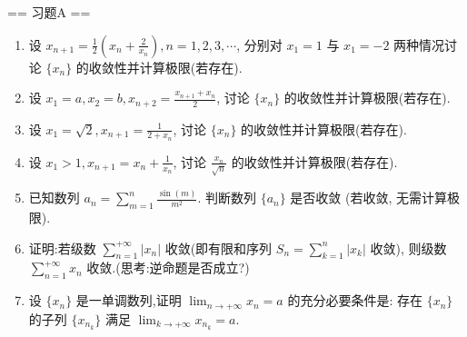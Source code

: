 \newenvironment{solution}{\begin{proofc}[解答]}{\end{proofc}}

== 习题A ==

\begin{enumerate}
    \item[1.]设 $\displaystyle x_{n + 1} = \frac{1}{2}\left(x_{n} + \frac{2}{x_{n}}\right), n = 1,2,3,\cdots$, 分别对 $x_{1} = 1$ 与 $x_{1} = -2$ 两种情况讨论 $\{x_{n}\}$ 的收敛性并计算极限(若存在).
    
    \item[2.]设 $\displaystyle x_{1} = a,x_{2} = b, x_{n + 2} = \frac{x_{n + 1} + x_{n}}{2}$, 讨论 $\{x_{n}\}$ 的收敛性并计算极限(若存在).
    
    \item[3.]设 $\displaystyle x_{1} = \sqrt{2}, x_{n + 1} = \frac{1}{2 + x_{n}}$, 讨论 $\{x_{n}\}$ 的收敛性并计算极限(若存在).

    \item[4.]设 $\displaystyle x_{1} > 1, x_{n + 1} = x_{n} + \frac{1}{x_{n}}$, 讨论 $\displaystyle\frac{x_{n}}{\sqrt{n}}$ 的收敛性并计算极限(若存在).

    \item[5.]已知数列 $\displaystyle a_{n} = \sum_{m = 1}^{n}\frac{\sin(m)}{m^{2}}$. 判断数列 $\{a_{n}\}$ 是否收敛 (若收敛, 无需计算极限).

    \item[6.]证明:若级数 $\displaystyle\sum_{n = 1}^{+\infty}|x_{n}|$ 收敛(即有限和序列 $\displaystyle S_{n} = \sum_{k = 1}^{n}|x_{k}|$ 收敛),
    则级数 $\displaystyle\sum_{n = 1}^{+\infty}x_{n}$ 收敛.(思考:逆命题是否成立?)

    \item[7.]设 $\{x_{n}\}$ 是一单调数列,证明 $\displaystyle\lim_{n\to +\infty}x_{n} = a$ 的充分必要条件是:
    存在 $\{x_{n}\}$ 的子列 $\{x_{n_{k}}\}$ 满足 $\displaystyle\lim_{k\to +\infty}x_{n_{k}} = a$.


\end{enumerate}
